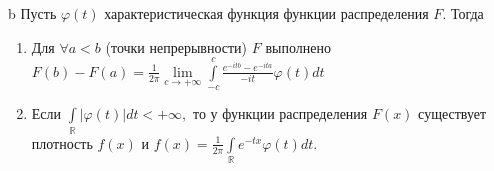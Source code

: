 	\begin{theorem}b
		Пусть \(\varphi(t)\) характеристическая функция функции распределения \(F\). Тогда
		\begin{enumerate}
			\item Для \(\forall a < b\) (точки непрерывности) \(F\) выполнено
			\(F(b) - F(a) = \frac{1}{2\pi} \lim\limits_{c \to +\infty} \int\limits_{-c}^{c} \frac{e^{-itb} - e^{-ita}}{-it}\varphi(t)dt\)
			\item Если \(\int\limits_\mathbb{R}|\varphi(t)|dt < +\infty,\) то у функции распределения \(F(x)\) существует плотность \(f(x)\) и \(f(x) = \frac{1}{2\pi}\int\limits_\mathbb{R} e^{-tx}\varphi(t)dt.\)
		\end{enumerate}
	\end{theorem}
	